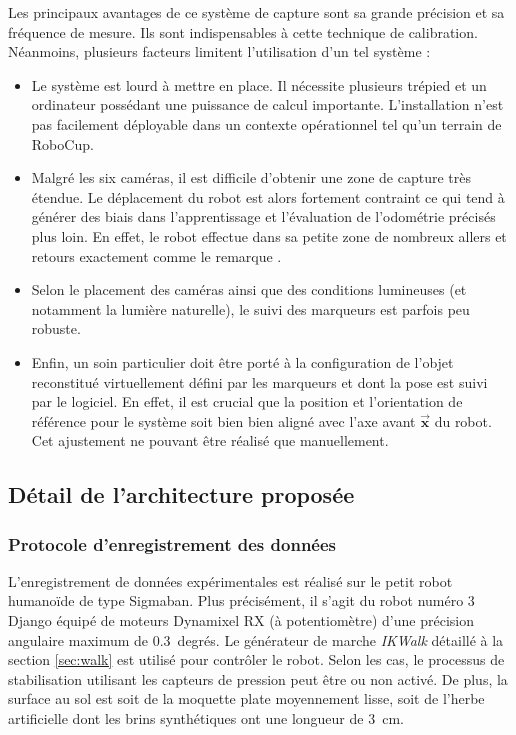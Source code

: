 Les principaux avantages de ce système de capture sont sa grande précision et
sa fréquence de mesure. Ils sont indispensables à cette technique de calibration.
Néanmoins, plusieurs facteurs limitent l'utilisation d'un tel système :
\begin{itemize}
    \item Le système est lourd à mettre en place. 
        Il nécessite plusieurs trépied et un ordinateur 
        possédant une puissance de calcul importante.
        L'installation n'est pas facilement déployable 
        dans un contexte opérationnel tel qu'un terrain de RoboCup.
    \item Malgré les six caméras, il est difficile d'obtenir une zone 
        de capture très étendue. Le déplacement du robot est alors 
        fortement contraint ce qui tend à générer des biais dans
        l'apprentissage et l'évaluation de l'odométrie précisés plus loin. 
        En effet, le robot effectue dans sa petite zone de nombreux 
        allers et retours exactement comme le remarque \cite{antonelli_calibration_2005}.
    \item Selon le placement des caméras ainsi que des conditions lumineuses 
        (et notamment la lumière naturelle), le suivi des marqueurs est 
        parfois peu robuste.
    \item Enfin, un soin particulier doit être porté à la configuration de l'objet
        reconstitué virtuellement défini par les marqueurs et dont la pose est suivi par le logiciel.
        En effet, il est crucial que la position et l'orientation de référence pour 
        le système soit bien bien aligné avec l'axe avant $\vec{\bm{x}}$ du robot. 
        Cet ajustement ne pouvant être réalisé que manuellement.
\end{itemize}

\subsection{Détail de l'architecture proposée}

\subsubsection{Protocole d'enregistrement des données}

L'enregistrement de données expérimentales est réalisé
sur le petit robot humanoïde de type Sigmaban. 
Plus précisément, il s'agit du robot numéro 3 Django équipé 
de moteurs Dynamixel RX (à potentiomètre) d'une précision angulaire 
maximum de $0.3$~degrés.
Le générateur de marche \textit{IKWalk} détaillé à la section 
\ref{sec:walk} est utilisé pour contrôler le robot.
Selon les cas, le processus de stabilisation utilisant
les capteurs de pression peut être ou non activé.
De plus, la surface au sol est soit de la moquette plate moyennement lisse,
soit de l'herbe artificielle dont les brins synthétiques 
ont une longueur de $3$~cm.

